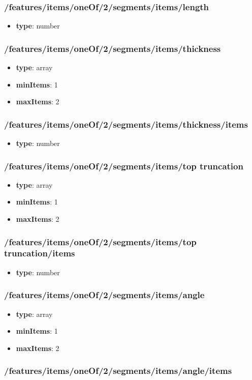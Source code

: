 \subsubsection{/features/items/oneOf/2/segments/items/length}
\begin{itemize}\item {\bf type}: number
\end{itemize}\subsubsection{/features/items/oneOf/2/segments/items/thickness}
\begin{itemize}\item {\bf type}: array
\item {\bf minItems}: 1
\item {\bf maxItems}: 2
\end{itemize}\subsubsection{/features/items/oneOf/2/segments/items/thickness/items}
\begin{itemize}\item {\bf type}: number
\end{itemize}\subsubsection{/features/items/oneOf/2/segments/items/top truncation}
\begin{itemize}\item {\bf type}: array
\item {\bf minItems}: 1
\item {\bf maxItems}: 2
\end{itemize}\subsubsection{/features/items/oneOf/2/segments/items/top truncation/items}
\begin{itemize}\item {\bf type}: number
\end{itemize}\subsubsection{/features/items/oneOf/2/segments/items/angle}
\begin{itemize}\item {\bf type}: array
\item {\bf minItems}: 1
\item {\bf maxItems}: 2
\end{itemize}\subsubsection{/features/items/oneOf/2/segments/items/angle/items}
